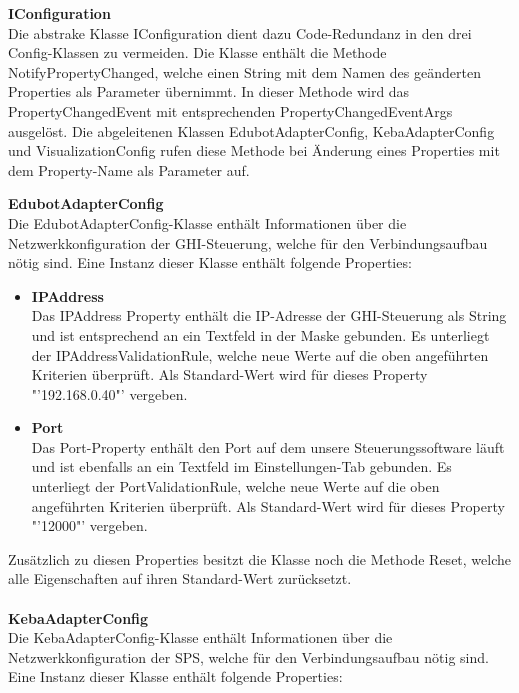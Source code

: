 \textbf{IConfiguration}\\
Die abstrake Klasse IConfiguration dient dazu Code-Redundanz in den drei Config-Klassen zu vermeiden. Die Klasse enthält die Methode NotifyPropertyChanged, welche einen String mit dem Namen des geänderten Properties als Parameter übernimmt. In dieser Methode wird das PropertyChangedEvent mit entsprechenden PropertyChangedEventArgs ausgelöst. Die abgeleitenen Klassen EdubotAdapterConfig, KebaAdapterConfig und VisualizationConfig rufen diese Methode bei Änderung eines Properties mit dem Property-Name als Parameter auf.

\textbf{EdubotAdapterConfig}\\
Die EdubotAdapterConfig-Klasse enthält Informationen über die Netzwerkkonfiguration der GHI-Steuerung, welche für den Verbindungsaufbau nötig sind.
Eine Instanz dieser Klasse enthält folgende Properties:
\begin{itemize}
\item \textbf{IPAddress}\\
Das IPAddress Property enthält die IP-Adresse der GHI-Steuerung als String und ist entsprechend an ein Textfeld in der Maske gebunden. Es unterliegt der IPAddressValidationRule, welche neue Werte auf die oben angeführten Kriterien überprüft. Als Standard-Wert wird für dieses Property "'192.168.0.40"' vergeben.
\item \textbf{Port}\\
Das Port-Property enthält den Port auf dem unsere Steuerungssoftware läuft und ist ebenfalls an ein Textfeld im Einstellungen-Tab gebunden. Es unterliegt der PortValidationRule,  welche neue Werte auf die oben angeführten Kriterien überprüft. Als Standard-Wert wird für dieses Property "'12000"' vergeben.
\end{itemize}
Zusätzlich zu diesen Properties besitzt die Klasse noch die Methode Reset, welche alle Eigenschaften auf ihren Standard-Wert zurücksetzt.\\
\\
\textbf{KebaAdapterConfig}\\
Die KebaAdapterConfig-Klasse enthält Informationen über die Netzwerkkonfiguration der SPS, welche für den Verbindungsaufbau nötig sind.
Eine Instanz dieser Klasse enthält folgende Properties:
